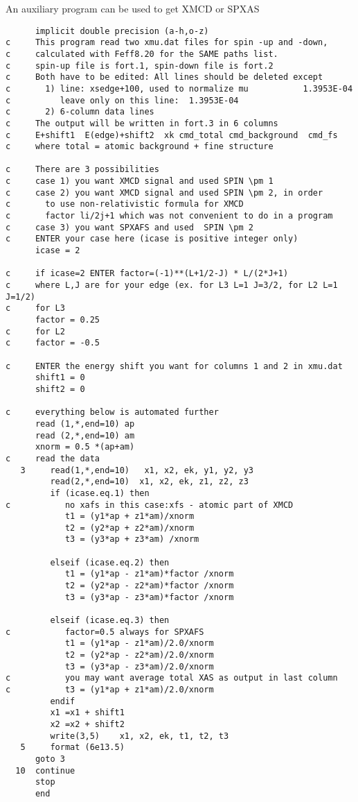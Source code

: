 \documentclass[11pt,oneside]{report} %
\begin{document}
An auxiliary program  can be used to get XMCD or SPXAS
\begin{verbatim}
      implicit double precision (a-h,o-z)
c     This program read two xmu.dat files for spin -up and -down,
c     calculated with Feff8.20 for the SAME paths list.
c     spin-up file is fort.1, spin-down file is fort.2
c     Both have to be edited: All lines should be deleted except
c       1) line: xsedge+100, used to normalize mu           1.3953E-04
c          leave only on this line:  1.3953E-04
c       2) 6-column data lines
c     The output will be written in fort.3 in 6 columns
c     E+shift1  E(edge)+shift2  xk cmd_total cmd_background  cmd_fs
c     where total = atomic background + fine structure

c     There are 3 possibilities
c     case 1) you want XMCD signal and used SPIN \pm 1
c     case 2) you want XMCD signal and used SPIN \pm 2, in order
c       to use non-relativistic formula for XMCD
c       factor li/2j+1 which was not convenient to do in a program
c     case 3) you want SPXAFS and used  SPIN \pm 2
c     ENTER your case here (icase is positive integer only)
      icase = 2

c     if icase=2 ENTER factor=(-1)**(L+1/2-J) * L/(2*J+1)
c     where L,J are for your edge (ex. for L3 L=1 J=3/2, for L2 L=1 J=1/2)
c     for L3
      factor = 0.25
c     for L2
c     factor = -0.5

c     ENTER the energy shift you want for columns 1 and 2 in xmu.dat
      shift1 = 0
      shift2 = 0

c     everything below is automated further
      read (1,*,end=10) ap
      read (2,*,end=10) am
      xnorm = 0.5 *(ap+am)
c     read the data
   3     read(1,*,end=10)   x1, x2, ek, y1, y2, y3
         read(2,*,end=10)  x1, x2, ek, z1, z2, z3
         if (icase.eq.1) then
c           no xafs in this case:xfs - atomic part of XMCD
            t1 = (y1*ap + z1*am)/xnorm
            t2 = (y2*ap + z2*am)/xnorm
            t3 = (y3*ap + z3*am) /xnorm

         elseif (icase.eq.2) then
            t1 = (y1*ap - z1*am)*factor /xnorm
            t2 = (y2*ap - z2*am)*factor /xnorm
            t3 = (y3*ap - z3*am)*factor /xnorm

         elseif (icase.eq.3) then
c           factor=0.5 always for SPXAFS
            t1 = (y1*ap - z1*am)/2.0/xnorm
            t2 = (y2*ap - z2*am)/2.0/xnorm
            t3 = (y3*ap - z3*am)/2.0/xnorm
c           you may want average total XAS as output in last column
c           t3 = (y1*ap + z1*am)/2.0/xnorm
         endif
         x1 =x1 + shift1
         x2 =x2 + shift2
         write(3,5)    x1, x2, ek, t1, t2, t3
   5     format (6e13.5)
      goto 3
  10  continue
      stop
      end
\end{verbatim}
\end{document}
